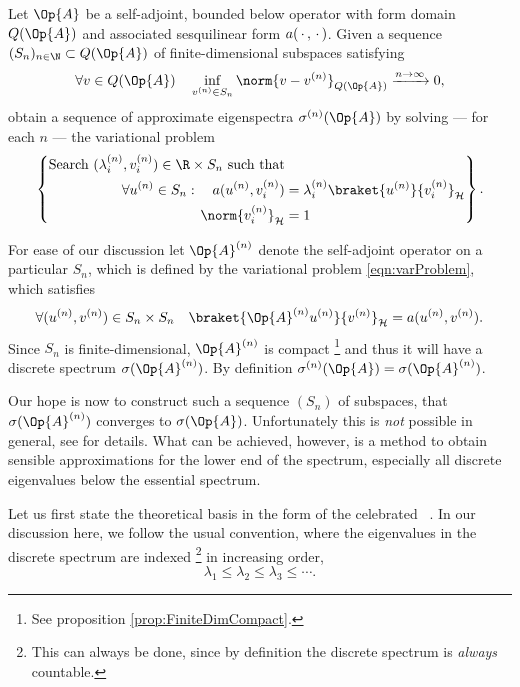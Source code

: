 \begin{defn}
	\label{defn:RitzGalerkin}
	Let $\Op{A}$ be a self-adjoint, bounded below operator
	with form domain $Q(\Op{A})$ and associated sesquilinear form $a(\,\cdot\,,\,\cdot\,)$.
	Given a sequence $(S_n)_{n\in\N} \subset Q(\Op{A})$
	of finite-dimensional subspaces satisfying
	\begin{equation}
		\forall v \in Q(\Op{A}) \quad \inf_{v^{(n)} \in S_n} \norm{v - v^{(n)}}_{Q(\Op{A})} \xrightarrow{n\to \infty} 0,
		\label{eqn:CondSubspaces}
	\end{equation}
	obtain a sequence of approximate eigenspectra $\sigma^{(n)}(\Op{A})$
	by solving --- for each $n$ --- the variational problem
	\begin{equation}
		\label{eqn:varProblem}
		\left\{
		\begin{aligned}
			\text{Search $(\lambda_i^{(n)}, v_i^{(n)}) \in \R \times S_n$ such that} & \\
			\forall u^{(n)} \in S_n: \quad a(u^{(n)}, v_i^{(n)})
			&= \lambda_i^{(n)} \braket{u^{(n)}}{v_i^{(n)}}_\hilbert \\
			\norm{v_i^{(n)}}_\hilbert &= 1
		\end{aligned}
		\right\}.
	\end{equation}
\end{defn}
For ease of our discussion let $\Op{A}^{(n)}$ denote the self-adjoint
operator on a particular $S_n$, which is defined by the variational problem
\eqref{eqn:varProblem}, \ie which satisfies
\[ \forall (u^{(n)}, v^{(n)}) \in S_n \times S_n \quad \braket{\Op{A}^{(n)} u^{(n)}}{v^{(n)}}_\hilbert = a(u^{(n)}, v^{(n)}). \]
Since $S_n$ is finite-dimensional, $\Op{A}^{(n)}$ is compact%
\footnote{See proposition \vref{prop:FiniteDimCompact}.}
and thus it will have a discrete spectrum $\sigma(\Op{A}^{(n)})$.
By definition $\sigma^{(n)}(\Op{A}) = \sigma(\Op{A}^{(n)})$.

Our hope is now to construct such a sequence $(S_n)$ of subspaces,
that $\sigma(\Op{A}^{(n)})$ converges to $\sigma(\Op{A})$.
Unfortunately this is \emph{not} possible in general,
see \cite{Helffer2013} for details.
What can be achieved, however, is a method to obtain
sensible approximations for the lower end of the spectrum,
especially all discrete eigenvalues below the essential spectrum.

Let us first state the theoretical basis
in the form of the celebrated ~\cite[p. 146]{Helffer2013}.
In our discussion here, we follow the usual convention,
where the eigenvalues in the discrete spectrum are indexed%
\footnote{This can always be done,
	since by definition the discrete spectrum is \emph{always} countable.}
in increasing order, \ie
\[ \lambda_1 \leq \lambda_2 \leq \lambda_3 \leq \cdots. \]

